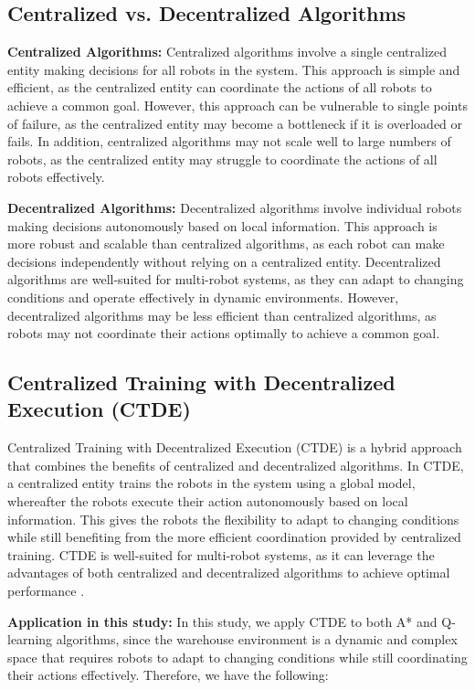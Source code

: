 \documentclass{kththesis}
\begin{document}
\subsection{Centralized vs. Decentralized Algorithms}

\textbf{Centralized Algorithms:}
Centralized algorithms involve a single centralized entity making decisions for all robots in the system. This approach is simple and efficient, as the centralized entity can coordinate the actions of all robots to achieve a common goal. However, this approach can be vulnerable to single points of failure, as the centralized entity may become a bottleneck if it is overloaded or fails. In addition, centralized algorithms may not scale well to large numbers of robots, as the centralized entity may struggle to coordinate the actions of all robots effectively.

\textbf{Decentralized Algorithms:}
Decentralized algorithms involve individual robots making decisions autonomously based on local information. This approach is more robust and scalable than centralized algorithms, as each robot can make decisions independently without relying on a centralized entity. Decentralized algorithms are well-suited for multi-robot systems, as they can adapt to changing conditions and operate effectively in dynamic environments. However, decentralized algorithms may be less efficient than centralized algorithms, as robots may not coordinate their actions optimally to achieve a common goal.

\subsection{Centralized Training with Decentralized Execution (CTDE)}
Centralized Training with Decentralized Execution (CTDE) is a hybrid approach that combines the benefits of centralized and decentralized algorithms. In CTDE, a centralized entity trains the robots in the system using a global model, whereafter the robots execute their action autonomously based on local information. This gives the robots the flexibility to adapt to changing conditions while still benefiting from the more efficient coordination provided by centralized training. CTDE is well-suited for multi-robot systems, as it can leverage the advantages of both centralized and decentralized algorithms to achieve optimal performance \parencite{CTDE17}.

\textbf{Application in this study:}
In this study, we apply CTDE to both A* and Q-learning algorithms, since the warehouse environment is a dynamic and complex space that requires robots to adapt to changing conditions while still coordinating their actions effectively. Therefore, we have the following:
\end{document}

